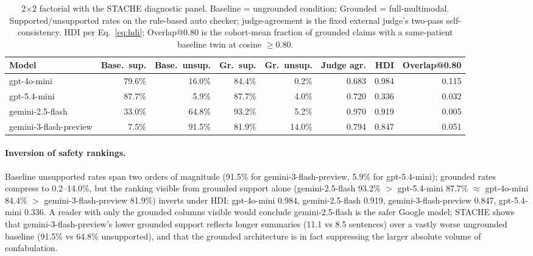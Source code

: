 \documentclass{article}
\theoremstyle{plain}
\begin{document}
\begin{table}[!t]
\centering
\small
\begin{tabular}{lrrrrrrr}
\toprule
\textbf{Model} & \textbf{Base.\ sup.} & \textbf{Base.\ unsup.} & \textbf{Gr.\ sup.} & \textbf{Gr.\ unsup.} & \textbf{Judge agr.} & \textbf{HDI} & \textbf{Overlap@0.80} \\
\midrule
gpt-4o-mini             & 79.6\% & 16.0\% & 84.4\% & 0.2\%  & 0.683 & 0.984 & 0.115 \\
gpt-5.4-mini            & 87.7\% & 5.9\%  & 87.7\% & 4.0\%  & 0.720 & 0.336 & 0.032 \\
gemini-2.5-flash        & 33.0\% & 64.8\% & 93.2\% & 5.2\%  & 0.970 & 0.919 & 0.005 \\
gemini-3-flash-preview  & 7.5\%  & 91.5\% & 81.9\% & 14.0\% & 0.794 & 0.847 & 0.051 \\
\bottomrule
\end{tabular}
\caption{2$\times$2 factorial with the STACHE diagnostic panel. Baseline = ungrounded condition; Grounded = full-multimodal. Supported/unsupported rates on the rule-based auto checker; judge-agreement is the fixed external judge's two-pass self-consistency. HDI per Eq.~\ref{eq:hdi}; Overlap@0.80 is the cohort-mean fraction of grounded claims with a same-patient baseline twin at cosine $\geq 0.80$.}
\label{tab:factorial}
\end{table}

\paragraph{Inversion of safety rankings.}
Baseline unsupported rates span two orders of magnitude (91.5\% for gemini-3-flash-preview, 5.9\% for gpt-5.4-mini); grounded rates compress to 0.2--14.0\%, but the ranking visible from grounded support alone (gemini-2.5-flash 93.2\% $>$ gpt-5.4-mini 87.7\% $\approx$ gpt-4o-mini 84.4\% $>$ gemini-3-flash-preview 81.9\%) inverts under HDI: gpt-4o-mini 0.984, gemini-2.5-flash 0.919, gemini-3-flash-preview 0.847, gpt-5.4-mini 0.336. A reader with only the grounded columns visible would conclude gemini-2.5-flash is the safer Google model; STACHE shows that gemini-3-flash-preview's lower grounded support reflects longer summaries (11.1 vs 8.5 sentences) over a vastly worse ungrounded baseline (91.5\% vs 64.8\% unsupported), and that the grounded architecture is in fact suppressing the larger absolute volume of confabulation.
\end{document}
